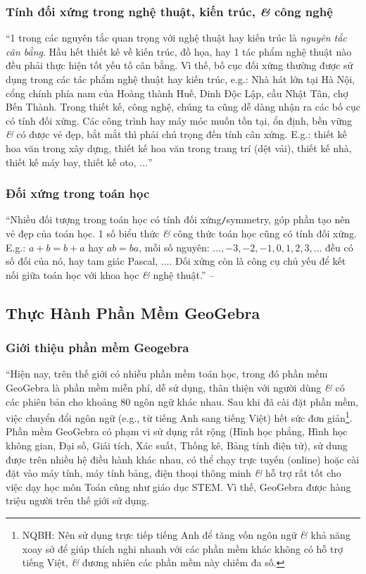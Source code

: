 \documentclass{article}
\numberwithin{equation}{section}
\begin{document}
\subsubsection{Tính đối xứng trong nghệ thuật, kiến trúc, \textit{\&} công nghệ}
``1 trong các nguyên tắc quan trọng với nghệ thuật hay kiến trúc là \textit{nguyên tắc cân bằng}. Hầu hết thiết kế về kiến trúc, đồ họa, hay 1 tác phẩm nghệ thuật nào đều phải thực hiện tốt yếu tố cân bằng. Vì thế, bố cục đối xứng thường được sử dụng trong các tác phẩm nghệ thuật hay kiến trúc, e.g.: Nhà hát lớn tại Hà Nội, cổng chính phía nam của Hoàng thành Huế, Dinh Độc Lập, cầu Nhật Tân, chợ Bến Thành. Trong thiết kế, công nghệ, chúng ta cũng dễ dàng nhận ra các bố cục có tính đối xứng. Các công trình hay máy móc muốn tồn tại, ổn định, bền vững \textit{\&} có được vẻ đẹp, bắt mắt thì phải chú trọng đến tính cân xứng. E.g.: thiết kế hoa văn trong xây dựng, thiết kế hoa văn trong trang trí (dệt vải), thiết kế nhà, thiết kế máy bay, thiết kế oto, $\ldots$'' \cite[pp. 114--115]{SGK_Toan_6_Canh_Dieu_tap_1}

\subsubsection{Đối xứng trong toán học}
``Nhiều đối tượng trong toán học có tính đối xứng\texttt{/}symmetry, góp phần tạo nên vẻ đẹp của toán học. 1 số biểu thức \textit{\&} công thức toán học cũng có tính đối xứng. E.g.: $a + b = b + a$ hay $ab = ba$, mỗi số nguyên: $\ldots,-3,-2,-1,0,1,2,3,\ldots$ đều có số đối của nó, hay tam giác Pascal, $\ldots$. Đối xứng còn là công cụ chủ yếu để kết nối giữa toán học với khoa học \textit{\&} nghệ thuật.'' -- \cite[p. 115]{SGK_Toan_6_Canh_Dieu_tap_1}


\subsection{Thực Hành Phần Mềm GeoGebra}

\subsubsection{Giới thiệu phần mềm Geogebra}
``Hiện nay, trên thế giới có nhiều phần mềm toán học, trong đó phần mềm GeoGebra là phần mềm miễn phí, dễ sử dụng, thân thiện với người dùng \textit{\&} có các phiên bản cho khoảng 80 ngôn ngữ khác nhau. Sau khi đã cài đặt phần mềm, việc chuyển đổi ngôn ngữ (e.g., từ tiếng Anh sang tiếng Việt) hết sức đơn giản\footnote{NQBH: Nên sử dụng trực tiếp tiếng Anh để tăng vốn ngôn ngữ \textit{\&} khả năng xoay sở để giúp thích nghi nhanh với các phần mềm khác không có hỗ trợ tiếng Việt, \textit{\&} đương nhiên các phần mềm này chiếm đa số.}. Phần mềm GeoGebra có phạm vi sử dụng rất rộng (Hình học phẳng, Hình học không gian, Đại số, Giải tích, Xác suất, Thống kê, Bảng tính điện tử), sử dung được trên nhiều hệ điều hành khác nhau, có thể chạy trực tuyến (online) hoặc cài đặt vào máy tính, máy tính bảng, điện thoại thông minh \textit{\&} hỗ trợ rất tốt cho việc dạy học môn Toán cũng như giáo dục STEM. Vì thế, GeoGebra được hàng triệu người trên thế giới sử dụng.
\end{document}
